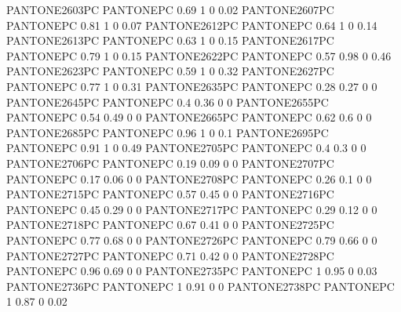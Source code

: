  {PANTONE2603PC} {PANTONE\SpotSpace PC} {0.69 1 0 0.02}
 {PANTONE2607PC} {PANTONE\SpotSpace PC} {0.81 1 0 0.07}
 {PANTONE2612PC} {PANTONE\SpotSpace PC} {0.64 1 0 0.14}
 {PANTONE2613PC} {PANTONE\SpotSpace PC} {0.63 1 0 0.15}
 {PANTONE2617PC} {PANTONE\SpotSpace PC} {0.79 1 0 0.15}
 {PANTONE2622PC} {PANTONE\SpotSpace PC} {0.57 0.98 0 0.46}
 {PANTONE2623PC} {PANTONE\SpotSpace PC} {0.59 1 0 0.32}
 {PANTONE2627PC} {PANTONE\SpotSpace PC} {0.77 1 0 0.31}
 {PANTONE2635PC} {PANTONE\SpotSpace PC} {0.28 0.27 0 0}
 {PANTONE2645PC} {PANTONE\SpotSpace PC} {0.4 0.36 0 0}
 {PANTONE2655PC} {PANTONE\SpotSpace PC} {0.54 0.49 0 0}
 {PANTONE2665PC} {PANTONE\SpotSpace PC} {0.62 0.6 0 0}
 {PANTONE2685PC} {PANTONE\SpotSpace PC} {0.96 1 0 0.1}
 {PANTONE2695PC} {PANTONE\SpotSpace PC} {0.91 1 0 0.49}
 {PANTONE2705PC} {PANTONE\SpotSpace PC} {0.4 0.3 0 0}
 {PANTONE2706PC} {PANTONE\SpotSpace PC} {0.19 0.09 0 0}
 {PANTONE2707PC} {PANTONE\SpotSpace PC} {0.17 0.06 0 0}
 {PANTONE2708PC} {PANTONE\SpotSpace PC} {0.26 0.1 0 0}
 {PANTONE2715PC} {PANTONE\SpotSpace PC} {0.57 0.45 0 0}
 {PANTONE2716PC} {PANTONE\SpotSpace PC} {0.45 0.29 0 0}
 {PANTONE2717PC} {PANTONE\SpotSpace PC} {0.29 0.12 0 0}
 {PANTONE2718PC} {PANTONE\SpotSpace PC} {0.67 0.41 0 0}
 {PANTONE2725PC} {PANTONE\SpotSpace PC} {0.77 0.68 0 0}
 {PANTONE2726PC} {PANTONE\SpotSpace PC} {0.79 0.66 0 0}
 {PANTONE2727PC} {PANTONE\SpotSpace PC} {0.71 0.42 0 0}
 {PANTONE2728PC} {PANTONE\SpotSpace PC} {0.96 0.69 0 0}
 {PANTONE2735PC} {PANTONE\SpotSpace PC} {1 0.95 0 0.03}
 {PANTONE2736PC} {PANTONE\SpotSpace PC} {1 0.91 0 0}
 {PANTONE2738PC} {PANTONE\SpotSpace PC} {1 0.87 0 0.02}
